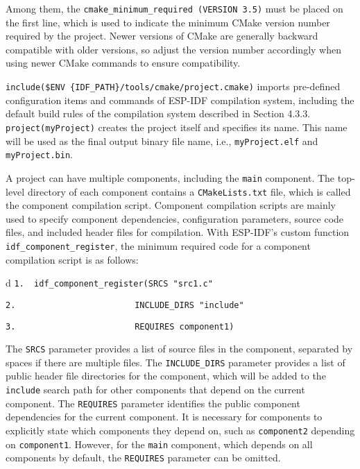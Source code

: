 \documentclass[a4paper,12pt]{book}
\begin{document}
Among them, the \verb|cmake_minimum_required (VERSION 3.5)| must be placed on the first line, which is used to indicate the minimum CMake version number required by the project. Newer versions of CMake are generally backward compatible with older versions, so adjust the version number accordingly when using newer CMake commands to ensure compatibility.

\verb|include($ENV {IDF_PATH}/tools/cmake/project.cmake)| imports pre-defined\\ configuration items and commands of ESP-IDF compilation system, including the default build rules of the compilation system described in Section 4.3.3. \verb|project(myProject)| creates the project itself and specifies its name. This name will be used as the final output binary file name, i.e., \verb|myProject.elf| and \verb|myProject.bin|.

A project can have multiple components, including the \verb|main| component. The top-level directory of each component contains a \verb|CMakeLists.txt| file, which is called the component compilation script. Component compilation scripts are mainly used to specify component dependencies, configuration parameters, source code files, and included header files for compilation. With ESP-IDF’s custom function \verb|idf_component_register|, the minimum required code for a component compilation script is as follows:

\begin{codebloc}
\begin{tabular}{d}
\verb|1.  idf_component_register(SRCS "src1.c"|

\verb|2.                        INCLUDE_DIRS "include"|

\verb|3.                        REQUIRES component1)|
\end{tabular}
\end{codebloc}

The \verb|SRCS| parameter provides a list of source files in the component, separated by spaces if there are multiple files. The \verb|INCLUDE_DIRS| parameter provides a list of public header file directories for the component, which will be added to the \verb|include| search path for other components that depend on the current component. The \verb|REQUIRES| parameter identifies the public component dependencies for the current component. It is necessary for components to explicitly state which components they depend on, such as \verb|component2| depending on \verb|component1|. However, for the \verb|main| component, which depends on all components by default, the \verb|REQUIRES| parameter can be omitted.
\end{document}
